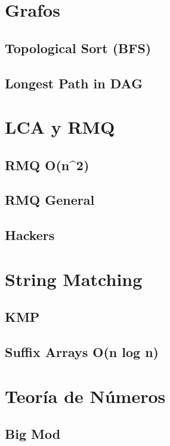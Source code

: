 \documentclass[10pt,letterpaper,twocolumn,twosided]{article}
\newcommand{\codigofuente}[1]{

\dotfill
}
\begin{document}
\section{Grafos}
\subsection{Topological Sort (BFS)}
\codigofuente{./graphs/topological_sort.cpp}

\subsection{Longest Path in DAG}
\codigofuente{./graphs/longest_path_in_dag.cpp}

\section {LCA y RMQ}
\subsection{RMQ O(n^2)}
\codigofuente{./lca/lca.cpp}
\subsection{RMQ General}
\codigofuente{./lca/lubenica.cpp}
\subsection{Hackers}
\codigofuente{./lca/hackers.cpp}


\section{String Matching}
\subsection{KMP}
\codigofuente{./string_matching/kmp.cpp}
\subsection{Suffix Arrays O(n log n)}
\codigofuente{./string_matching/suffix_arrays.cpp}
\medskip

\section{Teoría de Números}
\subsection{Big Mod}
\codigofuente{./teoria_numeros/bigMod.cpp}
\end{document}
